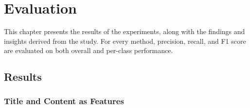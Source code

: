 \chapter{Evaluation}
\label{cha:5}


This chapter presents the results of the experiments, along with the findings and insights derived from the study. For every method, precision, recall, and F1 score are evaluated on both overall and per-class performance.

\section{Results}

\subsection{Title and Content as Features}

